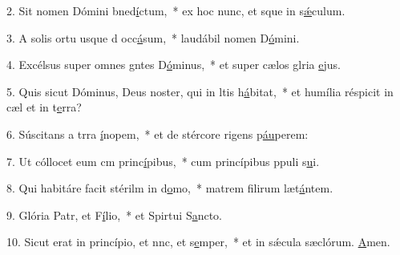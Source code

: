 2. Sit nomen Dómini bned\uline{í}ctum,~* ex hoc nunc, et sque in s\uline{ǽ}culum.\par 
3. A solis ortu usque d occ\uline{á}sum,~* laudábil nomen D\uline{ó}mini.\par 
4. Excélsus super omnes gntes D\uline{ó}minus,~* et super cælos glria \uline{e}jus.\par 
5. Quis sicut Dóminus, Deus noster, qui in ltis h\uline{á}bitat,~* et humília réspicit in cæl et in t\uline{e}rra?\par 
6. Súscitans a trra \uline{í}nopem,~* et de stércore rigens p\uline{áu}perem:\par 
7. Ut cóllocet eum cm princ\uline{í}pibus,~* cum princípibus ppuli s\uline{u}i.\par 
8. Qui habitáre facit stérilm in d\uline{o}mo,~* matrem filirum læt\uline{á}ntem.\par 
9. Glória Patr, et F\uline{í}lio,~* et Spirtui S\uline{a}ncto.\par 
10. Sicut erat in princípio, et nnc, et s\uline{e}mper,~* et in sǽcula sæclórum. \uline{A}men.\par 

